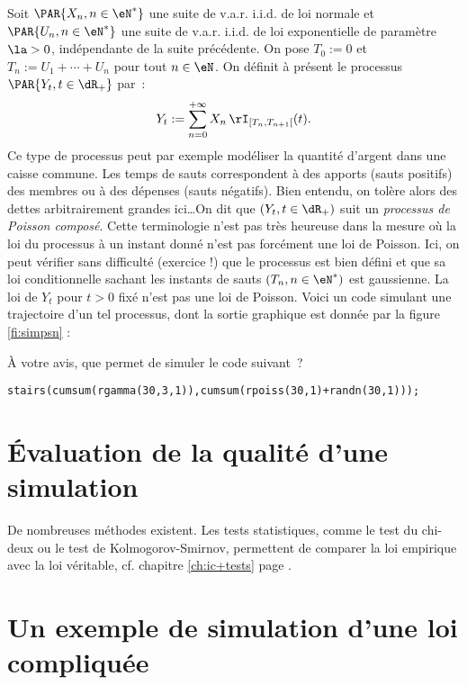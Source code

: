 Soit $\PAR{X_n,n\in\eN^*}$ une suite de v.a.r. i.i.d. de loi normale et
$\PAR{U_n,n\in\eN^*}$ une suite de v.a.r. i.i.d. de loi exponentielle de
paramètre $\la>0$, indépendante de la suite précédente. On pose $T_0:=0$ et
$T_n:=U_1+\cdots+U_n$ pour tout $n\in\eN\*$. On définit à présent le processus
$\PAR{Y_t,t\in\dR_+}$ par~:
$$
Y_t:=\sum_{n=0}^{+\infty} X_n\,\rI_{[T_n,T_{n+1}[}(t).
$$
Ce type de processus peut par exemple modéliser la quantité d'argent dans
une caisse commune. Les temps de sauts correspondent à des apports (sauts
positifs) des membres ou à des dépenses (sauts négatifs). Bien entendu, on
tolère alors des dettes arbitrairement grandes ici\ldots On dit que
$(Y_t,t\in\dR_+)$ suit un \emph{processus de Poisson composé}.  Cette
terminologie n'est pas très heureuse dans la mesure où la loi du processus à
un instant donné n'est pas forcément une loi de Poisson. Ici, on peut vérifier
sans difficulté (exercice !) que le processus est bien défini et que sa loi
conditionnelle sachant les instants de sauts $(T_n,n\in\eN^*)$ est gaussienne.
La loi de $Y_t$ pour $t>0$ fixé n'est pas une loi de Poisson. Voici un code
\ML{} simulant une trajectoire d'un tel processus, dont la sortie graphique
est donnée par la figure \ref{fi:simpsn} :
%
%
%
\begin{exo}
  À votre avis, que permet de simuler le code suivant~?
  \begin{center}
    \texttt{stairs(cumsum(rgamma(30,3,1)),cumsum(rpoiss(30,1)+randn(30,1)));}
  \end{center}
\end{exo}

%
\section{Évaluation de la qualité d'une simulation}
%

De nombreuses méthodes existent. Les tests statistiques, comme le test du
chi-deux ou le test de Kolmogorov-Smirnov, permettent de comparer la loi
empirique avec la loi véritable, cf. chapitre \ref{ch:ic+tests} page
\pageref{ch:ic+tests}. 

%
\section{Un exemple de simulation d'une loi compliquée}
%

